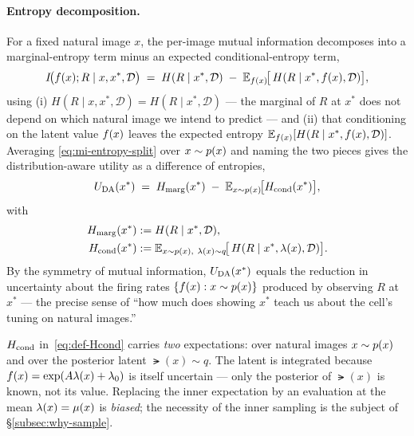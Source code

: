 \paragraph{Entropy decomposition.}
For a fixed natural image $x$, the per-image mutual information decomposes into a
marginal-entropy term minus an expected conditional-entropy term,
%
\begin{equation}
  I\!\big(f(x);R\mid x,x^{*},\mathcal D\big)
  \;=\;
  H(R\mid x^{*},\mathcal D)
  \;-\;
  \mathbb{E}_{f(x)}\!\big[\,H(R\mid x^{*},f(x),\mathcal D)\big],
  \label{eq:mi-entropy-split}
\end{equation}
%
using (i) $H(R\mid x,x^{*},\mathcal D)=H(R\mid x^{*},\mathcal D)$ --- the marginal
of $R$ at $x^{*}$ does not depend on which natural image we intend to predict ---
and (ii) that conditioning on the latent value $f(x)$ leaves the expected
entropy $\mathbb{E}_{f(x)}[H(R\mid x^{*},f(x),\mathcal D)]$. Averaging
\eqref{eq:mi-entropy-split} over $x\sim p(x)$ and naming the two pieces gives the
distribution-aware utility as a difference of entropies,
%
\begin{equation}
  U_{\mathrm{DA}}(x^{*}) \;=\; H_{\mathrm{marg}}(x^{*}) \;-\; \mathbb{E}_{x\sim p(x)}\!\big[H_{\mathrm{cond}}(x^{*})\big],
  \label{eq:Uda}
\end{equation}
%
with
%
\begin{align}
  H_{\mathrm{marg}}(x^{*}) &:= H(R\mid x^{*},\mathcal D), \label{eq:def-Hmarg-cond}\\
  H_{\mathrm{cond}}(x^{*}) &:= \mathbb{E}_{x\sim p(x),\ \lambda(x)\sim q}\!\big[\,H(R\mid x^{*},\lambda(x),\mathcal D)\big].
  \label{eq:def-Hcond}
\end{align}
%
By the symmetry of mutual information, $U_{\mathrm{DA}}(x^{*})$ equals the reduction in
uncertainty about the firing rates $\{f(x):x\sim p(x)\}$ produced by observing
$R$ at $x^{*}$ --- the precise sense of ``how much does showing $x^{*}$ teach us
about the cell's tuning on natural images.''

\begin{remark}\label{rem:double-exp}
$H_{\mathrm{cond}}$ in~\eqref{eq:def-Hcond} carries \emph{two} expectations: over natural
images $x\sim p(x)$ and over the posterior latent $\lat(x)\sim q$. The latent is
integrated because $f(x)=\exp(A\lambda(x)+\lambda_{0})$ is itself uncertain --- only
the posterior of $\lat(x)$ is known, not its value. Replacing the inner
expectation by an evaluation at the mean $\lambda(x)=\mu(x)$ is \emph{biased}; the
necessity of the inner sampling is the subject of \S\ref{subsec:why-sample}.
\end{remark}

